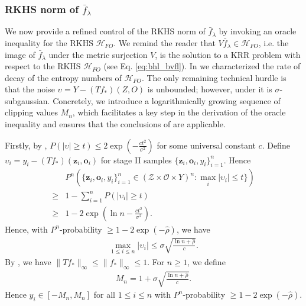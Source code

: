 \documentclass[11pt]{article}
\newcommand{\bz}{\mathbf z}
\newcommand{\bo}{\mathbf o}
\newcommand{\calZ}{\mathcal{Z}}
\newcommand{\calH}{\mathcal{H}}
\newcommand{\calO}{\mathcal{O}}
\newcommand{\0}{\mathbf{0}}
\begin{document}
\begin{appendix}
\subsubsection{RKHS norm of $\bar{f}_{\lambda}$}
We now provide a refined control of the RKHS norm of $\bar{f}_{\lambda}$ by invoking an oracle inequality for the RKHS $\calH_{FO}$. We remind the reader that $V\bar{f}_{\lambda}\in \calH_{FO}$, i.e. the image of $\bar{f}_{\lambda}$ under the metric surjection $V$, is the solution to a KRR problem with respect to the RKHS $\calH_{FO}$ (see Eq. \eqref{eq:bhl_bvfl}). In  we characterized the rate of decay of the entropy numbers of $\calH_{FO}$. The only remaining technical hurdle is that the noise $\upsilon = Y - (Tf_{\ast})(Z,O)$ is unbounded; however, under  it is $\sigma$-subgaussian. Concretely, we introduce a logarithmically growing sequence of clipping values $M_n$, which facilitates a key step in the derivation of the oracle inequality and ensures that the conclusions of \citet[Theorem 7.23]{steinwart2008support} are applicable. 

Firstly, by \citet[Eq. (2.14)]{vershynin2018high}, $P(|\upsilon|\geq t) \leq 2\exp(-\frac{ct^2}{\sigma^2})$ for some universal constant $c$. 
Define $\upsilon_i=y_i - (Tf_{\ast})(\bz_i, \bo_i)$ for stage II samples $\{\bz_i, \bo_i, y_i\}_{i=1}^n$. 
Hence
\begin{align*}
    &P^{n}\left( \{ \bz_i, \bo_i, y_i\}_{i=1}^n \in (\calZ \times \calO \times Y)^n : \max_i |\upsilon_i|\leq t\}\right)\\
    \geq & 1 - \sum_{i=1}^{n}P(|\upsilon_i|\geq t)\\
    \geq & 1 - 2\exp\left(\ln n - \frac{ct^2}{\sigma^2}\right).
\end{align*}
Hence, with $P^{n}$-probability $\geq 1 - 2\exp(-\hat{\rho})$, we have
\begin{align*}
    \max_{1\leq i\leq n}|\upsilon_i|\leq \sigma\sqrt{\frac{\ln n + \hat{\rho}}{c}}.
\end{align*}
By , we have $\|Tf_{\ast}\|_{\infty}\leq \|f_{\ast}\|_{\infty}\leq 1$. For $n\geq 1$, we define
\begin{align*}
    M_n = 1 + \sigma\sqrt{\frac{\ln n + \hat{\rho}}{c}}.
\end{align*}
Hence $y_i \in [-M_n, M_n]$ for all $1\leq i\leq n$ with $P^n$-probability $\geq 1 - 2\exp(-\hat{\rho})$. 


\end{appendix}
\end{document}
